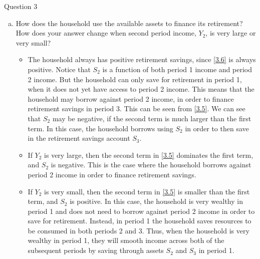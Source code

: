 \documentclass[a4paper]{article}
\newif\IfInSansMode
\begin{document}
\begin{questionbox}{Question 3}
\begin{enumerate}[(a)]
\begin{explanationbox}
\begin{equation}
				\end{equation}
				Substituting \cref{3.4} into \cref{3.5} to find \( S_3 \):
				\begin{align}
					S_3 &= \frac{\beta^2}{1+\beta^2}(Y_1 - \frac{\beta}{1 + \beta + \beta^2} Y_1 - \frac{1 + \beta^2}{R_2(1 + \beta + \beta^2)}Y_2) \notag \\
					&= \frac{\beta^2}{1+\beta^2}\left( \frac{1 + \beta^2}{R_2(1 + \beta + \beta^2)}Y_1 + \frac{1 + \beta^2}{R_2(1 + \beta + \beta^2)}Y_2 \right) \notag
				\intertext{Which, tidying up, yields the expression for \( S_3 \):}
				S_3 &= \frac{\beta^2}{1 + \beta + \beta^2} \left( Y_1 + \frac{Y_2}{R_2} \right) \label{3.6}
				\end{align}
			\end{explanationbox}
			\item How does the household use the available assets to finance its retirement? How does your answer change when second period income, \( Y_2 \), is very large or very small?
			\begin{explanationbox}
				\begin{itemize}
					\item The household always has positive retirement savings, since \cref{3.6} is always positive. Notice that \( S_2 \) is a function of both period 1 income and period 2 income. But the household can only save for retirement in period 1, when it does not yet have access to period 2 income. This means that the household may borrow against period 2 income, in order to finance retirement savings in period 3. This can be seen from \cref{3.5}. We can see that \( S_2 \) may be negative, if the second term is much larger than the first term. In this case, the household borrows using \( S_2 \) in order to then save in the retirement savings account \( S_3 \).
					\item If \( Y_2 \) is very large, then the second term in \cref{3.5} dominates the first term, and \( S_2 \) is negative. This is the case where the household borrows against period 2 income in order to finance retirement savings.
					\item If \( Y_2 \) is very small, then the second term in \cref{3.5} is smaller than the first term, and \( S_2 \) is positive. In this case, the household is very wealthy in period 1 and does not need to borrow against period 2 income in order to save for retirement. Instead, in period 1 the household saves resources to be consumed in both periods 2 and 3. Thus, when the household is very wealthy in period 1, they will smooth income across both of the subsequent periods by saving through assets \( S_2 \) and \( S_3 \) in period 1.

\end{itemize}
\end{explanationbox}
\end{enumerate}
\end{questionbox}
\end{document}
